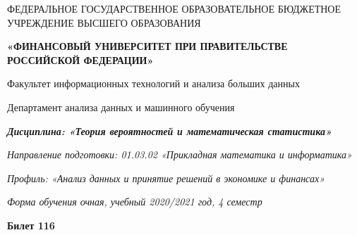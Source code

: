 \documentclass[a4paper,14pt]{article}
\begin{document}
\begin{center}
ФЕДЕРАЛЬНОЕ ГОСУДАРСТВЕННОЕ ОБРАЗОВАТЕЛЬНОЕ БЮДЖЕТНОЕ УЧРЕЖДЕНИЕ ВЫСШЕГО ОБРАЗОВАНИЯ

    \textbf{«ФИНАНСОВЫЙ УНИВЕРСИТЕТ ПРИ ПРАВИТЕЛЬСТВЕ РОССИЙСКОЙ ФЕДЕРАЦИИ»}

Факультет информационных технологий и анализа больших данных

Департамент анализа данных и машинного обучения

\textit{
	\textbf{Дисциплина: «Теория вероятностей и математическая статистика»}}

\textit{Направление подготовки: 01.03.02 «Прикладная математика и информатика»}

\textit{Профиль: «Анализ данных и принятие решений в экономике и финансах»}

\textit{Форма обучения очная, учебный 2020/2021 год, 4 семестр}

\textbf{Билет 116}

\end{center}
\end{document}
